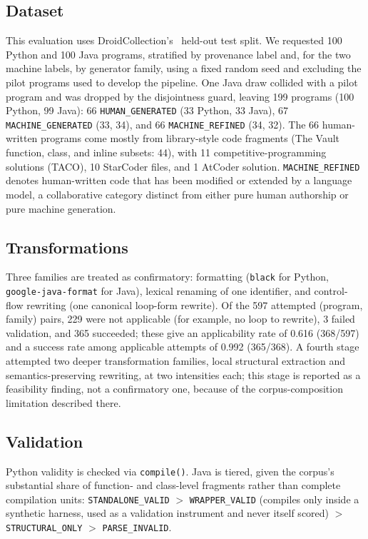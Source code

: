 \documentclass[sigconf,review,anonymous]{acmart}
\begin{document}
\subsection{Dataset}

This evaluation uses DroidCollection's~\cite{droid} held-out test split. We requested 100 Python and 100 Java programs, stratified by provenance label and, for the two machine labels, by generator family, using a fixed random seed and excluding the pilot programs used to develop the pipeline. One Java draw collided with a pilot program and was dropped by the disjointness guard, leaving 199 programs (100 Python, 99 Java): 66 \texttt{HUMAN\_GENERATED} (33 Python, 33 Java), 67 \texttt{MACHINE\_GENERATED} (33, 34), and 66 \texttt{MACHINE\_REFINED} (34, 32). The 66 human-written programs come mostly from library-style code fragments (The Vault function, class, and inline subsets: 44), with 11 competitive-programming solutions (TACO), 10 StarCoder files, and 1 AtCoder solution. \texttt{MACHINE\_REFINED} denotes human-written code that has been modified or extended by a language model, a collaborative category distinct from either pure human authorship or pure machine generation.

\subsection{Transformations}

Three families are treated as confirmatory: formatting (\texttt{black} for Python, \texttt{google-java-format} for Java), lexical renaming of one identifier, and control-flow rewriting (one canonical loop-form rewrite). Of the 597 attempted (program, family) pairs, 229 were not applicable (for example, no loop to rewrite), 3 failed validation, and 365 succeeded; these give an applicability rate of 0.616 (368/597) and a success rate among applicable attempts of 0.992 (365/368). A fourth stage attempted two deeper transformation families, local structural extraction and semantics-preserving rewriting, at two intensities each; this stage is reported as a feasibility finding, not a confirmatory one, because of the corpus-composition limitation described there.

\subsection{Validation}

Python validity is checked via \texttt{compile()}. Java is tiered, given the corpus's substantial share of function- and class-level fragments rather than complete compilation units: \texttt{STANDALONE\_VALID} $>$ \texttt{WRAPPER\_VALID} (compiles only inside a synthetic harness, used as a validation instrument and never itself scored) $>$ \texttt{STRUCTURAL\_ONLY} $>$ \texttt{PARSE\_INVALID}.
\end{document}
